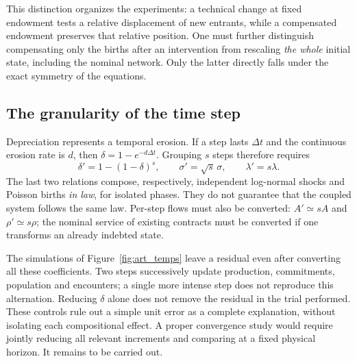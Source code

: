 This distinction organizes the experiments: a technical change at fixed
endowment tests a relative displacement of new entrants, while a
compensated endowment preserves that relative position. One must
further distinguish compensating only the births after an intervention
from rescaling \emph{the whole} initial state, including the nominal
network. Only the latter directly falls under the exact symmetry of
the equations.

\subsection{The granularity of the time step}\label{sec:temps}
Depreciation represents a temporal erosion. If a step lasts $\Delta t$
and the continuous erosion rate is $d$, then $\delta=1-e^{-d\Delta t}$.
Grouping $s$ steps therefore requires
\[
 \delta'=1-(1-\delta)^s,\qquad
 \sigma'=\sqrt{s}\,\sigma,\qquad \lambda'=s\lambda.
\]
The last two relations compose, respectively, independent log-normal
shocks and Poisson births \emph{in law}, for isolated phases. They do
not guarantee that the coupled system follows the same law. Per-step
flows must also be converted: $A'\simeq sA$ and $\rho'\simeq s\rho$; the
nominal service of existing contracts must be converted if one
transforms an already indebted state.


The simulations of Figure~\ref{fig:art_temps} leave a residual even
after converting all these coefficients. Two steps successively update
production, commitments, population and encounters; a single more
intense step does not reproduce this alternation. Reducing $\delta$
alone does not remove the residual in the trial performed. These
controls rule out a simple unit error as a complete explanation,
without isolating each compositional effect. A proper convergence study
would require jointly reducing all relevant increments and comparing at
a fixed physical horizon. It remains to be carried out.

